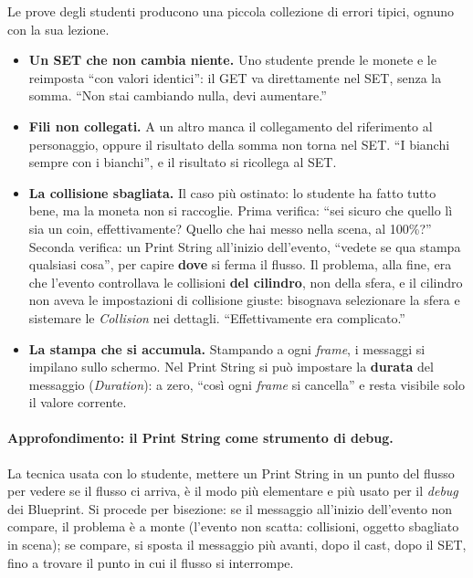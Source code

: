 Le prove degli studenti producono una piccola collezione di errori tipici,
ognuno con la sua lezione.
\begin{itemize}
  \item \textbf{Un SET che non cambia niente.} Uno studente prende le monete
        e le reimposta ``con valori identici'': il GET va direttamente nel
        SET, senza la somma. ``Non stai cambiando nulla, devi aumentare.''
  \item \textbf{Fili non collegati.} A un altro manca il collegamento del
        riferimento al personaggio, oppure il risultato della somma non torna
        nel SET. ``I bianchi sempre con i bianchi'', e il risultato si
        ricollega al SET.
  \item \textbf{La collisione sbagliata.} Il caso più ostinato: lo studente
        ha fatto tutto bene, ma la moneta non si raccoglie. Prima verifica:
        ``sei sicuro che quello lì sia un coin, effettivamente? Quello che hai
        messo nella scena, al 100\%?'' Seconda verifica: un Print String
        all'inizio dell'evento, ``vedete se qua stampa qualsiasi cosa'', per
        capire \textbf{dove} si ferma il flusso. Il problema, alla fine, era
        che l'evento controllava le collisioni \textbf{del cilindro}, non
        della sfera, e il cilindro non aveva le impostazioni di collisione
        giuste: bisognava selezionare la sfera e sistemare le
        \emph{Collision} nei dettagli. ``Effettivamente era complicato.''
  \item \textbf{La stampa che si accumula.} Stampando a ogni \emph{frame}, i
        messaggi si impilano sullo schermo. Nel Print String si può impostare
        la \textbf{durata} del messaggio (\emph{Duration}): a zero, ``così ogni
        \emph{frame} si cancella'' e resta visibile solo il valore corrente.
\end{itemize}

\paragraph{Approfondimento: il Print String come strumento di debug.} La
tecnica usata con lo studente, mettere un Print String in un punto del flusso
per vedere se il flusso ci arriva, è il modo più elementare e più usato per il
\emph{debug} dei Blueprint. Si procede per bisezione: se il messaggio
all'inizio dell'evento non compare, il problema è a monte (l'evento non
scatta: collisioni, oggetto sbagliato in scena); se compare, si sposta il
messaggio più avanti, dopo il cast, dopo il SET, fino a trovare il punto in
cui il flusso si interrompe.

